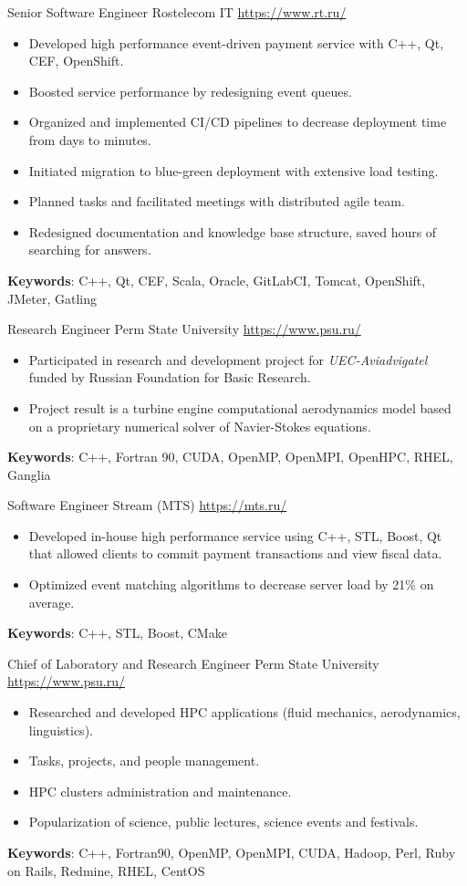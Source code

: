 \documentclass[a4paper, serif, 12pt]{moderncv}
\begin{document}
        {Senior Software Engineer}
        {Rostelecom IT}
        {\url{https://www.rt.ru/}}
        {}
        {\begin{itemize}
\item Developed high performance event-driven payment service with C++, Qt, CEF, OpenShift.
\item Boosted service performance by redesigning event queues.
\item Organized and implemented CI/CD pipelines to decrease deployment time from days to minutes.
\item Initiated migration to blue-green deployment with extensive load testing.
\item Planned tasks and facilitated meetings with distributed agile team.
\item Redesigned documentation and knowledge base structure, saved hours of searching for answers.
\end{itemize}
\textbf{Keywords}: C++, Qt, CEF, Scala, Oracle, GitLabCI, Tomcat, OpenShift, JMeter, Gatling}

        {Research Engineer}
        {Perm State University}
        {\url{https://www.psu.ru/}}
        {}
        {\begin{itemize}
\item Participated in research and development project for \textit{UEC-Aviadvigatel} funded by Russian Foundation for Basic Research.
\item Project result is a turbine engine computational aerodynamics model based on a proprietary numerical solver of Navier-Stokes equations.
\end{itemize}
\textbf{Keywords}: C++, Fortran 90, CUDA, OpenMP, OpenMPI, OpenHPC, RHEL, Ganglia}

        {Software Engineer}
        {Stream (MTS)}
        {\url{https://mts.ru/}}
        {}
        {\begin{itemize}
\item Developed in-house high performance service using C++, STL, Boost, Qt that allowed clients to commit payment transactions and view fiscal data.
\item Optimized event matching algorithms to decrease server load by 21\% on average.
\end{itemize}
\textbf{Keywords}: C++, STL, Boost, CMake}

        {Chief of Laboratory and Research Engineer}
        {Perm State University}
        {\url{https://www.psu.ru/}}
        {}
        {\begin{itemize}
\item Researched and developed HPC applications (fluid mechanics, aerodynamics, linguistics).
\item Tasks, projects, and people management.
\item HPC clusters administration and maintenance.
\item Popularization of science, public lectures, science events and festivals.
\end{itemize}
\textbf{Keywords}: C++, Fortran90, OpenMP, OpenMPI, CUDA, Hadoop, Perl, Ruby on Rails, Redmine, RHEL, CentOS}
\end{document}
